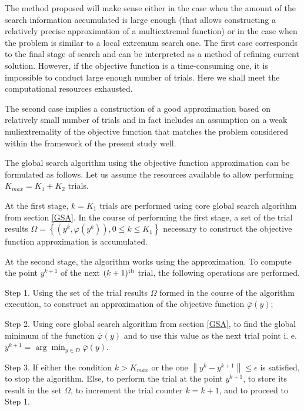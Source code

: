 \documentclass[applsci,article,submit,moreauthors,pdftex]{Definitions/mdpi}
\begin{document}
The method proposed will make sense either in the case when the amount of the search information accumulated is large enough (that allows constructing a relatively precise approximation of a multiextremal function) or in the case when the problem is similar to a local extremum search one.
The first case corresponds to the final stage of search and can be interpreted as a method of refining current solution. However, if the objective function is a time-consuming one, it is impossible to conduct large enough number of trials. Here we shall meet the computational resources exhausted.

The second case implies a construction of a good approximation based on relatively small number of trials and in fact includes an assumption on a weak muliextremality of the objective function that matches the problem considered within the framework of the present study well.
 
The global search algorithm using the objective function approximation can be formulated as follows.
Let us assume the resources available to allow performing $K_{max} = K_1 + K_2$ trials.

At the first stage, $k = K_1$ trials are performed using core global search algorithm from section \ref{GSA}.
In the course of performing the first stage, a set of the trial results $\Omega = \left\{(y^k, \varphi(y^k)), 0\leq k\leq K_1\right\}$ necessary to construct the objective function approximation is accumulated.

At the second stage, the algorithm works using the approximation. To compute the point $y^{k+1}$ of the next $(k+1)^{\rm th}$ trial, the following operations are performed.

Step 1. Using the set of the trial results $\Omega$ formed in the course of the algorithm execution, to construct an approximation of the objective function $\overline{\varphi}(y)$;

Step 2. Using core global search algorithm from section \ref{GSA}, to find the global minimum of the function $\overline{\varphi}(y)$ and to use this value as the next trial point i. e. $y^{k+1} = \arg \min_{y \in D} \overline{\varphi}(y)$.

Step 3. If either the condition $k>K_{max}$ or the one $\left\|y^k - y^{k+1}\right\| \leq \epsilon$ is satisfied, to stop the algorithm.
Else, to perform the trial at the point $y^{k+1}$, to store its result in the set $\Omega$, to increment the trial counter $k = k+1$, and to proceed to Step 1.
\end{document}
